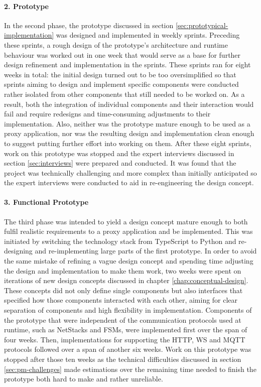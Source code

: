 \paragraph{2. Prototype} In the second phase, the prototype discussed in section \ref{sec:prototypical-implementation} was designed and implemented in weekly sprints. Preceding these sprints, a rough design of the prototype's architecture and runtime behaviour was worked out in one week that would serve as a base for further design refinement and implementation in the sprints. These sprints ran for eight weeks in total: the initial design turned out to be too oversimplified so that sprints aiming to design and implement specific components were conducted rather isolated from other components that still needed to be worked on. As a result, both the integration of individual components and their interaction would fail and require redesigns and time-consuming adjustments to their implementation. Also, neither was the prototype mature enough to be used as a proxy application, nor was the resulting design and implementation clean enough to suggest putting further effort into working on them. After these eight sprints, work on this prototype was stopped and the expert interviews discussed in section \ref{sec:interviews} were prepared and conducted. It was found that the project was technically challenging and more complex than initially anticipated so the expert interviews were conducted to aid in re-engineering the design concept.

\paragraph{3. Functional Prototype} The third phase was intended to yield a design concept mature enough to both fulfil realistic requirements to a proxy application and be implemented. This was initiated by switching the technology stack from TypeScript to Python and re-designing and re-implementing large parts of the first prototype. In order to avoid the same mistake of refining a vague design concept and spending time adjusting the design and implementation to make them work, two weeks were spent on iterations of new design concepts discussed in chapter \ref{chap:conceptual-design}. These concepts did not only define single components but also interfaces that specified how those components interacted with each other, aiming for clear separation of components and high flexibility in implementation. Components of the prototype that were independent of the communication protocols used at runtime, such as NetStacks and \acp{FSM}, were implemented first over the span of four weeks. Then, implementations for supporting the \ac{HTTP}, \ac{WS} and \ac{MQTT} protocols followed over a span of another six weeks. Work on this prototype was stopped after those ten weeks as the technical difficulties discussed in section \ref{sec:pm-challenges} made estimations over the remaining time needed to finish the prototype both hard to make and rather unreliable.
